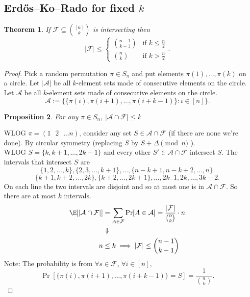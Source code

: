\documentclass[a4paper]{article}
\newtheorem{thm}{Theorem}[section]
\newtheorem{prop}[thm]{Proposition}
\begin{document}
\subsection{Erd\H{o}s--Ko--Rado for fixed $k$}

\begin{thm}
    If $\mathcal{F}\subseteq {[n] \choose k}$ is intersecting then 
    \[
    |\mathcal{F}|\leq \begin{cases}
        {n-1 \choose k-1} & \text{if $k\leq \frac{n}{2}$}\\
        {{n \choose k}} & \text{if $k>\frac{n}{2}$}
    \end{cases}
    .\] 
\end{thm}
\begin{proof}
    Pick a random permutation $\pi\in S_n$ and put elements $\pi(1),...,\pi(k)$ on a circle. Let $|\mathcal{A}|$ be all $k$-element sets made of consecutive elements on the circle. \\
    Let $\mathcal{A}$ be all $k$-element sets made of consecutive elements on the circle. 
    \[
    \mathcal{A}:= \{ \{\pi(i),\pi(i+1),...,\pi(i+k-1) \}: i\in [n]\}
    .\] 
    \begin{prop}
        For any $\pi \in S_n$, $|\mathcal{A}\cap \mathcal{F}|\leq k$
    \end{prop}
    \noindent WLOG $\pi=(1 \text{ } 2 \text{ } ... n)$, consider any set $S\in \mathcal{A}\cap \mathcal{F}$ (if there are none we're done). By circular symmetry (replacing $S$ by $S+\Delta \pmod n$ ). \\
    WLOG $S= \{k,k+1,...,2k-1\}$ and every other $S'\in \mathcal{A}\cap \mathcal{F}$ intersect $S$. The intervals that intersect $S$ are 
    \[
    \{1, 2,..., k\}, \{2,3,...,k+1\}, ..., \{n-k+1, n-k+2,...,n\}
    .\] 
    \[
    \{k+1,k+2,...,2k\}, \{k+2,...,2k+1\}, ..., {2k_-1,2k,...,3k-2}
    .\] 
    On each line the two intervals are disjoint and so at most one is in $\mathcal{A}\cap \mathcal{F}$. So there are at most $k$ intervals.
    \[
    \begin{aligned}
    \E[|\mathcal{A}\cap \mathcal{F}|]&=\sum_{A\in \mathcal{F}} \Pr[A\in \mathcal{A}]=\frac{|\mathcal{F}|}{\binom{n}{k}}\cdot n\\
    &\Downarrow\\
    n&\leq k\implies |\mathcal{F}|\leq \binom{n-1}{k-1}
    \end{aligned}
    \] 
    Note: The probability is from $\forall s\in \mathcal{F}$, $\forall i\in [n]$, 
    \[
    \Pr[ \{\pi(i),\pi(i+1),...,\pi(i+k-1)\}=S]=\frac{1}{{n \choose k}}
    .\] 
\end{proof}
\newpage
\end{document}
